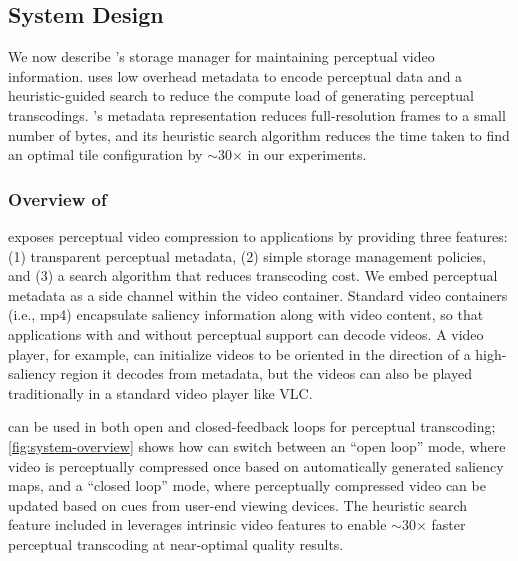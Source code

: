 
\subsection{\nameStore System Design}
\label{sec:system}


We now describe \name's storage manager for maintaining perceptual video information.
\nameStore uses low overhead metadata to encode perceptual data and a heuristic-guided search to reduce the compute load of generating perceptual transcodings.
\nameStore's metadata representation reduces full-resolution frames to a small number of bytes, and its heuristic search algorithm reduces the time taken to find an optimal tile configuration by $\sim$30$\times$ in our experiments.

\subsubsection{Overview of \nameStore}
\label{sec:system:goals}

\nameStore exposes perceptual video compression to applications by providing three features: (1) transparent perceptual metadata, (2) simple storage management policies, and (3) a search algorithm that reduces transcoding cost.
We embed perceptual metadata as a side channel within the video container.
Standard video containers (i.e., mp4) encapsulate saliency information along with video content, so that applications with and without perceptual support can decode \name videos.
A \threesixty video player, for example, can initialize videos to be oriented in the direction of a high-saliency region it decodes from \name metadata, but the videos can also be played traditionally in a standard video player like VLC. %

\systemOverviewFigure

\nameStore can be used in both open and closed-feedback loops for perceptual transcoding; \ref{fig:system-overview} shows how \nameStore can switch between an ``open loop'' mode, where video is perceptually compressed once based on automatically generated saliency maps, and a ``closed loop'' mode, where perceptually compressed video can be updated based on cues from user-end viewing devices.
The heuristic search feature included in \nameStore leverages intrinsic video features to enable $\sim$30$\times$ faster perceptual transcoding at near-optimal quality results.

